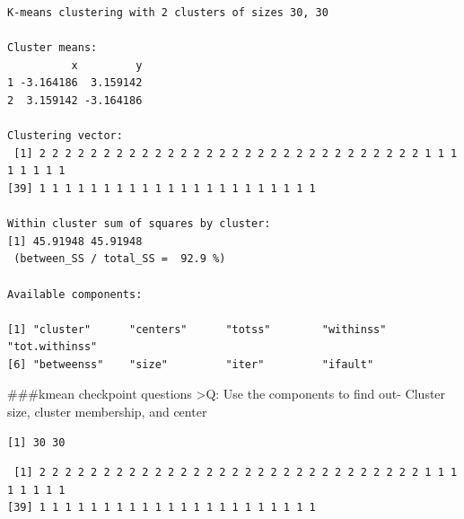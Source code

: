 \documentclass[
  letterpaper,
  DIV=11,
  numbers=noendperiod]{scrartcl}
\newenvironment{Shaded}{\begin{snugshade}}{\end{snugshade}}
\newcommand{\CommentTok}[1]{\textcolor[rgb]{0.37,0.37,0.37}{#1}}
\newcommand{\NormalTok}[1]{\textcolor[rgb]{0.00,0.23,0.31}{#1}}
\newcommand{\SpecialCharTok}[1]{\textcolor[rgb]{0.37,0.37,0.37}{#1}}
\begin{document}
\begin{verbatim}
K-means clustering with 2 clusters of sizes 30, 30

Cluster means:
          x         y
1 -3.164186  3.159142
2  3.159142 -3.164186

Clustering vector:
 [1] 2 2 2 2 2 2 2 2 2 2 2 2 2 2 2 2 2 2 2 2 2 2 2 2 2 2 2 2 2 2 1 1 1 1 1 1 1 1
[39] 1 1 1 1 1 1 1 1 1 1 1 1 1 1 1 1 1 1 1 1 1 1

Within cluster sum of squares by cluster:
[1] 45.91948 45.91948
 (between_SS / total_SS =  92.9 %)

Available components:

[1] "cluster"      "centers"      "totss"        "withinss"     "tot.withinss"
[6] "betweenss"    "size"         "iter"         "ifault"      
\end{verbatim}

\#\#\#kmean checkpoint questions \textgreater Q: Use the components to
find out- Cluster size, cluster membership, and center

\begin{Shaded}
\end{Shaded}

\begin{verbatim}
[1] 30 30
\end{verbatim}

\begin{Shaded}
\end{Shaded}

\begin{verbatim}
 [1] 2 2 2 2 2 2 2 2 2 2 2 2 2 2 2 2 2 2 2 2 2 2 2 2 2 2 2 2 2 2 1 1 1 1 1 1 1 1
[39] 1 1 1 1 1 1 1 1 1 1 1 1 1 1 1 1 1 1 1 1 1 1
\end{verbatim}

\begin{Shaded}
\end{Shaded}
\end{document}

